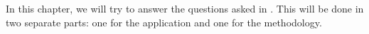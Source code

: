 In this chapter, we will try to answer the questions asked in . This will be done in two separate parts: one for the application and one for the methodology.